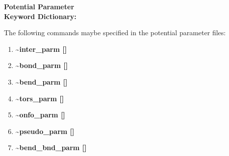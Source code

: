 \documentclass[12pt]{article}
\begin{document}
\clearpage
\begin{center}
\huge
{\bf Potential Parameter \\ Keyword Dictionary: } 
\end{center}
\large

The following commands maybe specified in the potential parameter files:
\begin{enumerate}
\LARGE
\item {\bf \~{ }inter\_parm []}
\item {\bf \~{ }bond\_parm []}
\item {\bf \~{ }bend\_parm []}
\item {\bf \~{ }tors\_parm []}
\item {\bf \~{ }onfo\_parm []}
\item {\bf \~{ }pseudo\_parm []}
\item {\bf \~{ }bend\_bnd\_parm []}
\end{enumerate}

\end{document}
